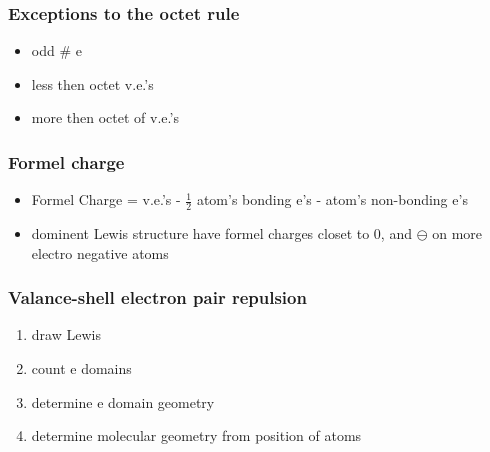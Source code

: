 \documentclass[ wastespaceontitle, english]{cheat_sheet_template}
\begin{document}
    \subsubsection{Exceptions to the octet rule}
    \begin{itemize}
        \item odd \# e 
        \item less then octet v.e.'s
        \item more then octet of v.e.'s
    \end{itemize}
    \subsubsection{Formel charge}
    \begin{itemize}
        \item  Formel Charge = 
        v.e.'s - $\frac{1}{2}$ atom's bonding e's - atom's non-bonding e's
        \item dominent Lewis structure have formel charges closet to 0, and $\ominus$ on more electro negative atoms
    \end{itemize}
    \subsubsection{Valance-shell electron pair repulsion}
    \begin{enumerate}
        \item draw Lewis
        \item count e domains
        \item determine e domain geometry
        \item determine molecular geometry from position of atoms
    \end{enumerate}
                
\end{document}
